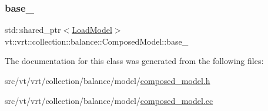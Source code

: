 \subsubsection{\texorpdfstring{base\+\_\+}{base\_}}
{\footnotesize\ttfamily std\+::shared\+\_\+ptr$<$\hyperlink{structvt_1_1vrt_1_1collection_1_1balance_1_1_load_model}{Load\+Model}$>$ vt\+::vrt\+::collection\+::balance\+::\+Composed\+Model\+::base\+\_\+\hspace{0.3cm}{\ttfamily [private]}}



The documentation for this class was generated from the following files\+:\begin{DoxyCompactItemize}
\item 
src/vt/vrt/collection/balance/model/\hyperlink{composed__model_8h}{composed\+\_\+model.\+h}\item 
src/vt/vrt/collection/balance/model/\hyperlink{composed__model_8cc}{composed\+\_\+model.\+cc}\end{DoxyCompactItemize}
